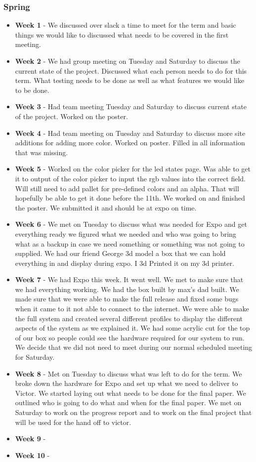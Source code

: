 \documentclass[onecolumn, draftclsnofoot,10pt, compsoc]{IEEEtran}
\begin{document}
			\subsubsection{Spring}
				\begin{itemize}
					\item \textbf{Week 1} - We discussed over slack a time to meet for the term and basic things we would like to discussed what needs to be covered in the first meeting.   
					\item \textbf{Week 2} - We had group meeting on Tuesday and Saturday to discuss the current state of the project. Discussed what each person needs to do for this term. What testing needs to be done as well as what features we would like to be done.  
					\item \textbf{Week 3} - Had team meeting Tuesday and Saturday to discuss current state of the project. Worked on the poster.  
					\item \textbf{Week 4} - Had team meeting on Tuesday and Saturday to discuss more site additions for adding more color.  Worked on poster. Filled in all information that was missing.  
					\item \textbf{Week 5} - Worked on the color picker for the led states page. Was able to get it to output of the color picker to input the rgb values into the correct field. Will still need to add pallet for pre-defined colors and an alpha. That will hopefully be able to get it done before the 11th. We worked on and finished the poster. We submitted it and should be at expo on time.  
					\item \textbf{Week 6} - We met on Tuesday to discuss what was needed for Expo and get everything ready we figured what we needed and who was going to bring what as a backup in case we need something or something was not going to supplied.  We had our friend George 3d model a box that we can hold everything in and display during expo. I 3d Printed it on my 3d printer.  
					\item \textbf{Week 7} - We had Expo this week. It went well. We met to make sure that we had everything working. We had the box built by max's dad built. We made sure that we were able to make the full release  and fixed some bugs when it came to it not able to connect to the internet. We were able to make the full system and created several different profiles to display the different aspects of the system as we explained it. We had some acrylic cut for the top of our box so people could see the hardware required for our system to run. We decide that we did not need to meet during our normal scheduled meeting for Saturday.  
					\item \textbf{Week 8} - Met on Tuesday to discuss what was left to do for the term. We broke down the hardware for Expo and set up what we need to deliver to Victor. We started laying out what needs to be done for the final paper. We outlined who is going to do what and when for the final paper. We met on Saturday to work on the progress report and to work on the final project that will be used for the hand off to victor. 
					\item \textbf{Week 9} - 
					\item \textbf{Week 10} - 
				\end{itemize}
\end{document}
